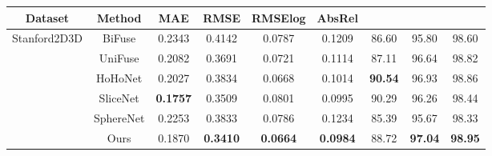 \documentclass[letterpaper]{article} \usepackage{aaai21}  \usepackage{times}  \usepackage{helvet} \usepackage{courier}  \usepackage[hyphens]{url}  \usepackage{graphicx} \urlstyle{rm} \def\UrlFont{\rm}  \usepackage{natbib}  \usepackage{caption} \frenchspacing  \setlength{\pdfpagewidth}{8.5in}  \setlength{\pdfpageheight}{11in}
\begin{document}
\begin{table*}[!htb]
\centering
    \begin{tabular}{ccccccccc} 
\toprule 
Dataset & Method & MAE & RMSE & RMSElog &  AbsRel &  &  & \\
\midrule 
\multirow{6}{*}{Stanford2D3D} & BiFuse  & 0.2343 & 0.4142 & 0.0787 & 0.1209 & 86.60 & 95.80 & 98.60 \\
                            ~ & UniFuse & 0.2082 & 0.3691 & 0.0721 & 0.1114 & 87.11 & 96.64 & 98.82\\
                            ~ & HoHoNet & 0.2027 & 0.3834 & 0.0668 & 0.1014 & \textbf{90.54} & 96.93 & 98.86\\
                            ~ & SliceNet&  \textbf{0.1757} & 0.3509 & 0.0801 & 0.0995 & 90.29 & 96.26 & 98.44\\
                            ~ & SphereNet & 0.2253 & 0.3833 & 0.0786 & 0.1234 & 85.39 & 95.67 & 98.33\\
                            ~ & Ours    & 0.1870 & \textbf{0.3410} & \textbf{0.0664} & \textbf{0.0984} & 88.72 & \textbf{97.04} & \textbf{98.95} \\


\end{tabular}
\end{table*}
\end{document}
